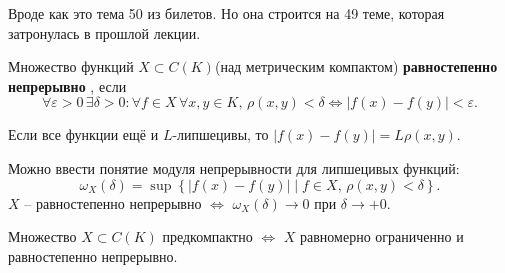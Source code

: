 Вроде как это тема 50 из билетов. Но она строится на 49 теме, которая затронулась в прошлой лекции.

\begin{to_def}
	Множество функций $X \subset C(K)$(над метрическим компактом) \textbf{равностепенно непрерывно} , если $$\forall \varepsilon >0 \, \exists \delta > 0 \colon \forall f \in X\, \forall x, y \in K, \, \rho(x,y) < \delta \Leftrightarrow |f(x) - f(y)| < \varepsilon.$$
\end{to_def}
Если все функции ещё и $L$-липшецивы, то $|f(x) - f(y)| = L \rho(x,y)$.

Можно ввести понятие модуля непрерывности для липшецивых функций:
\begin{equation*}
	\omega_X(\delta) = \sup \left\{|f(x) - f(y)| \mid f \in X, \, \rho(x,y) < \delta \right\}.
\end{equation*}
$X$ -- равностепенно непрерывно $\Longleftrightarrow$ $\omega_X(\delta) \to 0$ при $\delta \to +0$.

\begin{to_thr}
	Множество $X \subset C(K)$ предкомпактно $\Longleftrightarrow$ $X$ равномерно ограниченно и равностепенно непрерывно.
\end{to_thr}